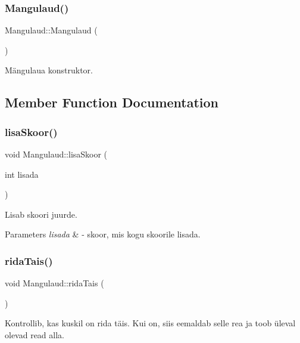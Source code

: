 \subsubsection{\texorpdfstring{Mangulaud()}{Mangulaud()}}
{\footnotesize\ttfamily Mangulaud\+::\+Mangulaud (\begin{DoxyParamCaption}{ }\end{DoxyParamCaption})}

Mängulaua konstruktor. 

\subsection{Member Function Documentation}
\mbox{\label{class_mangulaud_ac1eb20dea1713fbf7baacecefcd76481}} 
\subsubsection{\texorpdfstring{lisaSkoor()}{lisaSkoor()}}
{\footnotesize\ttfamily void Mangulaud\+::lisa\+Skoor (\begin{DoxyParamCaption}\item[{int}]{lisada }\end{DoxyParamCaption})}

Lisab skoori juurde. 
\begin{DoxyParams}{Parameters}
{\em lisada} & -\/ skoor, mis kogu skoorile lisada. \\
\hline
\end{DoxyParams}
\mbox{\label{class_mangulaud_a5b22a965c640d97549afcef1a101278d}} 
\subsubsection{\texorpdfstring{ridaTais()}{ridaTais()}}
{\footnotesize\ttfamily void Mangulaud\+::rida\+Tais (\begin{DoxyParamCaption}{ }\end{DoxyParamCaption})}

Kontrollib, kas kuskil on rida täis. Kui on, siis eemaldab selle rea ja toob üleval olevad read alla. \mbox{\label{class_mangulaud_a38e9432a82198c83a445629086980904}} 
